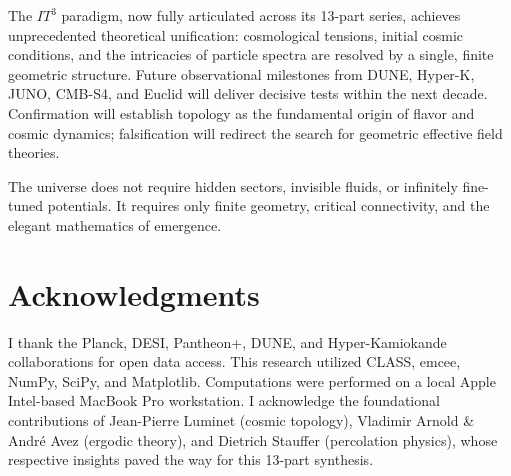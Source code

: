 \documentclass[12pt,a4paper]{article}
\begin{document}
The $IT^3$ paradigm, now fully articulated across its 13-part series, achieves unprecedented theoretical unification: cosmological tensions, initial cosmic conditions, and the intricacies of particle spectra are resolved by a single, finite geometric structure. Future observational milestones from DUNE, Hyper-K, JUNO, CMB-S4, and Euclid will deliver decisive tests within the next decade. Confirmation will establish topology as the fundamental origin of flavor and cosmic dynamics; falsification will redirect the search for geometric effective field theories. 

The universe does not require hidden sectors, invisible fluids, or infinitely fine-tuned potentials. It requires only finite geometry, critical connectivity, and the elegant mathematics of emergence.

\section*{Acknowledgments}
I thank the Planck, DESI, Pantheon+, DUNE, and Hyper-Kamiokande collaborations for open data access. This research utilized CLASS, emcee, NumPy, SciPy, and Matplotlib. Computations were performed on a local Apple Intel-based MacBook Pro workstation. I acknowledge the foundational contributions of Jean-Pierre Luminet (cosmic topology), Vladimir Arnold \& André Avez (ergodic theory), and Dietrich Stauffer (percolation physics), whose respective insights paved the way for this 13-part synthesis.
\end{document}
